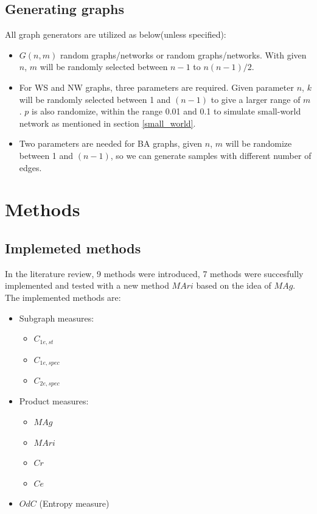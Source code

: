 \documentclass[12pt]{article}
\begin{document}
\subsection{Generating graphs}
\label{generate_graphs}
All graph generators are utilized as below(unless specified):
\begin{itemize}
    \item $G(n,m)$ random graphs/networks or random graphs/networks. With given $n$, $m$ will be randomly selected between $n-1$ to $n(n-1)/2$.
    \item For WS and NW graphs, three parameters are required. Given parameter $n$, $k$ will be randomly selected between 1 and $(n-1)$ to give a larger range of $m$. $p$ is also randomize, within the range 0.01 and 0.1 to simulate small-world network as mentioned in section \ref{small_world}.
    \item Two parameters are needed for BA graphs, given $n$, $m$ will be randomize between 1 and $(n-1)$, so we can generate samples with different number of edges.
\end{itemize}

\section{Methods}
\subsection{Implemeted methods}
In the literature review\cite{litreview}, 9 methods were introduced, 7 methods were succesfully implemented and tested with a new method $MAri$ based on the idea of $MAg$. The implemented methods are:
\begin{itemize}
    \item Subgraph measures:
    \begin{itemize}
        \item $C_{1e,st}$
        \item $C_{1e,spec}$
        \item $C_{2e,spec}$
    \end{itemize}
    \item Product measures:
    \begin{itemize}
        \item $MAg$
        \item $MAri$
        \item $Cr$
        \item $Ce$
    \end{itemize}
    \item $OdC$ (Entropy measure)
\end{itemize}
\end{document}
